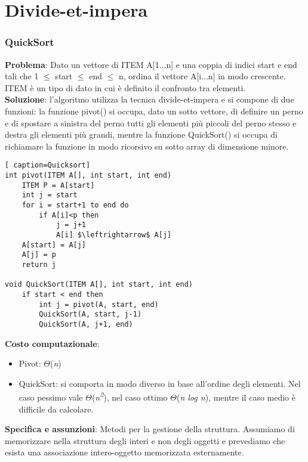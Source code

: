 \documentclass[../cheatSheetAlgoritmi.tex]{subfiles}
\begin{document}
\chapter{Divide-et-impera}
\subsection{QuickSort}
\label{sec:quicksort}
\textbf{Problema}: Dato un vettore di ITEM A[1...n] e una coppia di indici start e end tali che 1  $\leq$ start  $\leq$ end  $\leq$ n, ordina il vettore A[i...n] in modo crescente. ITEM è un tipo di dato in cui è definito il confronto tra elementi.\\
\textbf{Soluzione}: l'algoritmo utilizza la tecnica divide-et-impera e si compone di due funzioni: la funzione pivot() si occupa, dato un sotto vettore, di definire un perno e di spostare a sinistra del perno tutti gli elementi più piccoli del perno stesso e  destra  gli elementi più grandi, mentre la funzione QuickSort() si occupa di richiamare la funzione in modo ricorsivo su sotto array di dimensione minore.\
\begin{lstlisting}[ caption=Quicksort]
int pivot(ITEM A[], int start, int end)
	ITEM P = A[start]
	int j = start
	for i = start+1 to end do
		if A[i]<p then 
			j = j+1
			A[i] $\leftrightarrow$ A[j]
	A[start] = A[j]
	A[j] = p	
	return j

void QuickSort(ITEM A[], int start, int end)
	if start < end then
		int j = pivot(A, start, end)
		QuickSort(A, start, j-1)
		QuickSort(A, j+1, end)		
\end{lstlisting}
\textbf{Costo computazionale}:
\begin{itemize}
 	\item Pivot: $\Theta$(\textit{n}) 
 	\item QuickSort: si comporta in modo diverso in base all'ordine degli elementi. Nel caso pessimo vale $\Theta$(\textit{n\textsuperscript{2}}), nel caso ottimo  $\Theta$(\textit{n log n}), mentre il caso medio è difficile da calcolare. 
\end{itemize}
\textbf{Specifica e assunzioni}: Metodi per la gestione della struttura. Assumiamo di memorizzare nella struttura degli interi e non degli oggetti e prevediamo che esista una associazione intero-oggetto memorizzata esternamente.\
\end{document}
